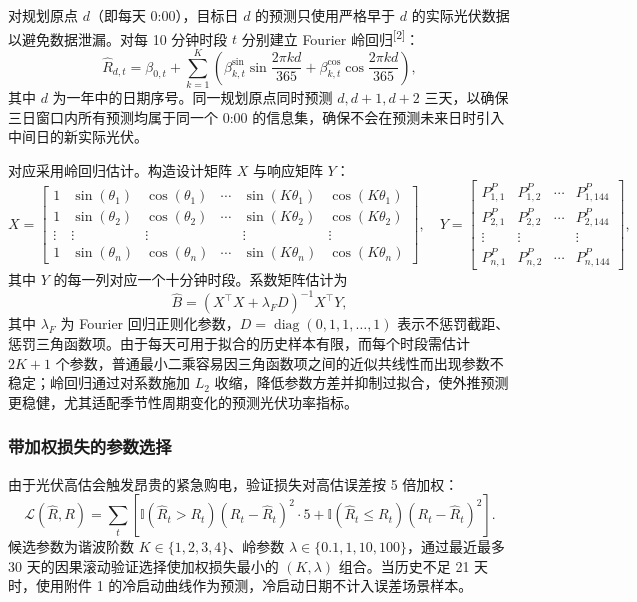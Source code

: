 \documentclass[withoutpreface,bwprint]{cumcmthesis} %
\begin{document}
对规划原点 $d$（即每天 0:00），目标日 $d$ 的预测只使用严格早于 $d$ 的实际光伏数据以避免数据泄漏。对每 10 分钟时段 $t$ 分别建立 Fourier 岭回归\textsuperscript{[2]}：
\begin{equation}
    \hat{R}_{d,t} = \beta_{0,t} + \sum_{k=1}^{K}\left(\beta^{\sin}_{k,t}\sin\frac{2\pi kd}{365}+\beta^{\cos}_{k,t}\cos\frac{2\pi kd}{365}\right),
    \label{eq:q2-fourier}
\end{equation}
其中 $d$ 为一年中的日期序号。同一规划原点同时预测 $d, d+1, d+2$ 三天，以确保三日窗口内所有预测均属于同一个 0:00 的信息集，确保不会在预测未来日时引入中间日的新实际光伏。

对应采用岭回归估计。构造设计矩阵 $X$ 与响应矩阵 $Y$：
\[
X=
\begin{bmatrix}
1 & \sin(\theta_1) & \cos(\theta_1) & \cdots & \sin(K\theta_1) & \cos(K\theta_1)\\
1 & \sin(\theta_2) & \cos(\theta_2) & \cdots & \sin(K\theta_2) & \cos(K\theta_2)\\
\vdots & \vdots & \vdots & & \vdots & \vdots\\
1 & \sin(\theta_n) & \cos(\theta_n) & \cdots & \sin(K\theta_n) & \cos(K\theta_n)
\end{bmatrix},
\quad
Y=
\begin{bmatrix}
P_{1,1}^{P} & P_{1,2}^{P} & \cdots & P_{1,144}^{P}\\
P_{2,1}^{P} & P_{2,2}^{P} & \cdots & P_{2,144}^{P}\\
\vdots & \vdots & & \vdots\\
P_{n,1}^{P} & P_{n,2}^{P} & \cdots & P_{n,144}^{P}
\end{bmatrix},
\]
其中 $Y$ 的每一列对应一个十分钟时段。系数矩阵估计为
\begin{equation}
\widehat B=\left(X^{\top}X+\lambda_F D\right)^{-1}X^{\top}Y,
\label{eq:q2-ridge}
\end{equation}
其中 $\lambda_F$ 为 Fourier 回归正则化参数，$D=\operatorname{diag}(0,1,1,\ldots,1)$ 表示不惩罚截距、惩罚三角函数项。由于每天可用于拟合的历史样本有限，而每个时段需估计 $2K+1$ 个参数，普通最小二乘容易因三角函数项之间的近似共线性而出现参数不稳定；岭回归通过对系数施加 $L_2$ 收缩，降低参数方差并抑制过拟合，使外推预测更稳健，尤其适配季节性周期变化的预测光伏功率指标。

\subsubsection{带加权损失的参数选择}

由于光伏高估会触发昂贵的紧急购电，验证损失对高估误差按 5 倍加权：
\begin{equation}
    \mathcal{L}(\hat{R}, R) = \sum_{t}\left[\mathbb{I}(\hat{R}_t>R_t)(R_t-\hat{R}_t)^2\cdot 5 + \mathbb{I}(\hat{R}_t\le R_t)(R_t-\hat{R}_t)^2\right].
    \label{eq:q2-loss}
\end{equation}
候选参数为谐波阶数 $K\in\{1,2,3,4\}$、岭参数 $\lambda\in\{0.1,1,10,100\}$，通过最近最多 30 天的因果滚动验证选择使加权损失最小的 $(K, \lambda)$ 组合。当历史不足 21 天时，使用附件 1 的冷启动曲线作为预测，冷启动日期不计入误差场景样本。
\end{document}
